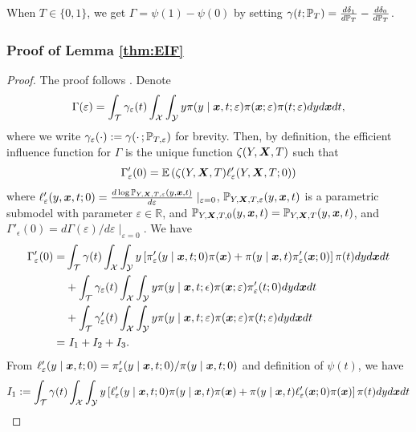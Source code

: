 \begin{corollary}
When $T\in\{0,1\}$, we get $\Gamma=\psi(1)-\psi(0)$ by setting $\gamma(t;\P_T)=\frac{d\delta_1}{d\P_T}-\frac{d\delta_0}{d\P_T}$.
\end{corollary}
\fi


\subsubsection{Proof of Lemma \ref{thm:EIF}}\label{appendix_proof:EIF_single}
\begin{proof}
The proof follows \cite{kennedy2017non}. Denote
\[
\Gamma(\varepsilon)=\int_{\mathcal{T}}\gamma_{\varepsilon}(t)\int_{\mathcal{X}}\int_{\mathcal{Y}}y\pi(y\mid\x,t;\varepsilon)\pi(\x;\varepsilon)\pi(t;\varepsilon)dyd\x dt,
\]
where we write $\gamma_{\varepsilon}(\cdot):=\gamma(\cdot\,;\P_{T,\varepsilon})$ for brevity.
Then, by definition, the efficient influence function for $\Gamma$ is the
unique function $\zeta(Y,\X,T)$ such that 
\begin{equation}\label{eq_appendix:EIF_target}
\Gamma'_{\varepsilon}(0)=\E\left(\zeta(Y,\X,T)\ell'_{\varepsilon}(Y,\X,T;0)\right)
\end{equation}
where $\ell'_{\varepsilon}(y,\x,t;0)=\frac{d\log\P_{Y,\X,T,\varepsilon}(y,\x,t)}{d\varepsilon}\mid_{\varepsilon=0}$, $\P_{Y,\X,T,\varepsilon}(y,\x,t)$ is a parametric submodel with parameter $\varepsilon\in\mathbb{R}$, and $\P_{Y,\X,T,0}(y,\x,t)=\P_{Y,\X,T}(y,\x,t)$,
and $\Gamma'_{\epsilon}(0)=d\Gamma(\varepsilon)/d\varepsilon \mid_{\varepsilon=0}$. We have
\begin{align*}
\Gamma'_{\varepsilon}(0)  =&\int_{\mathcal{T}}\gamma(t)\int_{\mathcal{X}}\int_{\mathcal{Y}}y\left[\pi_{\varepsilon}'(y\mid\x,t;0)\pi(\x)+\pi(y\mid\x,t)\pi'_{\varepsilon}(\x;0)\right]\pi(t)dyd\x dt
\\
 & +\int_{\mathcal{T}}\gamma_{\varepsilon}(t)\int_{\mathcal{X}}\int_{\mathcal{Y}}y\pi(y\mid\x,t;\epsilon)\pi(\x;\varepsilon)\pi'_{\varepsilon}(t;0)dyd\x dt
\\&+\int_{\mathcal{T}}\gamma'_{\varepsilon}(t)\int_{\mathcal{X}}\int_{\mathcal{Y}}y\pi(y\mid\x,t;\varepsilon)\pi(\x;\varepsilon)\pi(t;\varepsilon)dyd\x dt
 \\
=&\,\,I_{1}+I_{2}+I_3.
\end{align*}
From $\ell_{\varepsilon}'(y\mid\x,t;0)=\pi'_{\varepsilon}(y\mid\x,t;0)/\pi(y\mid\x,t;0)$ and definition of $\psi(t)$, we have
\begin{align*}
I_{1} & :=\int_{\mathcal{T}}\gamma(t)\int_{\mathcal{X}}\int_{\mathcal{Y}}y\left[\ell'_{\varepsilon}(y\mid\x,t;0)\pi(y\mid\x,t)\pi(\x)+\pi(y\mid\x,t)\ell'_{\varepsilon}(\x;0)\pi(\x)\right]\pi(t)dyd\x dt\\

\end{align*}
\end{proof}
